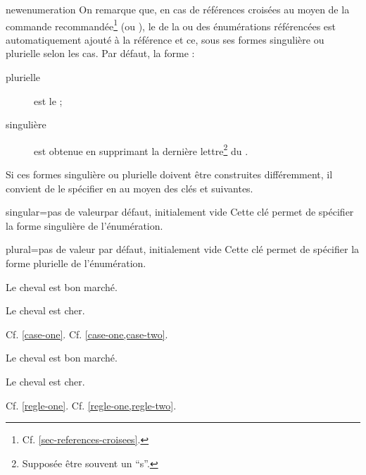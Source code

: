 \documentclass[french,nolocaltoc]{nwejmart}
\newtheorem[style=definition]{fait}
\newtheorem[title=contraventionnalisation]{ctrv}
\newtheorem[title-plural=anneaux]{anneau}
\newtheorem[title-plural=idéaux]{idéal}
\begin{document}
\begin{docCommand}[doc new=2019-03-18]{newenumeration}{}
On remarque que, en cas de références croisées au moyen de la commande
recommandée\footnote{Cf. \vref{sec-references-croisees}.}  (ou
), le  de la ou des énumérations référencées est
automatiquement ajouté à la référence et ce, sous ses formes singulière ou
plurielle selon les cas. Par défaut, la forme :
\begin{description}
\item[plurielle] est le  ;
\item[singulière] est obtenue en supprimant la dernière lettre\footnote{Supposée être
  souvent un \enquote{s}.} du .
\end{description}
Si ces formes singulière ou plurielle doivent être construites différemment, il
convient de le spécifier en  au moyen des clés
 et  suivantes.
  \begin{docKey}{singular}{={}}{pas de
      valeurpar défaut, initialement vide}
    Cette clé permet de spécifier la forme singulière de l'énumération.
  \end{docKey}
  \begin{docKey}{plural}{={}}{pas de
      valeur par défaut, initialement vide}
    Cette clé permet de spécifier la forme plurielle de l'énumération.
  \end{docKey}
\begin{preamblecode}
\end{preamblecode}
\begin{bodycode}[listing and text,listing options={deletekeywords={[2]label}}]
\begin{cas}
\item\label{case-one} Le cheval est bon marché.
\item\label{case-two} Le cheval est cher.
\end{cas}
Cf. \vref{case-one}. Cf. \vref{case-one,case-two}.
\end{bodycode}

\begin{preamblecode}
\end{preamblecode}
\begin{bodycode}[listing and text,listing options={deletekeywords={[2]label}}]
\begin{regles}
\item\label{regle-one} Le cheval est bon marché.
\item\label{regle-two} Le cheval est cher.
\end{regles}
Cf. \vref{regle-one}. Cf. \vref{regle-one,regle-two}.
\end{bodycode}
%
\end{docCommand}
\end{document}

